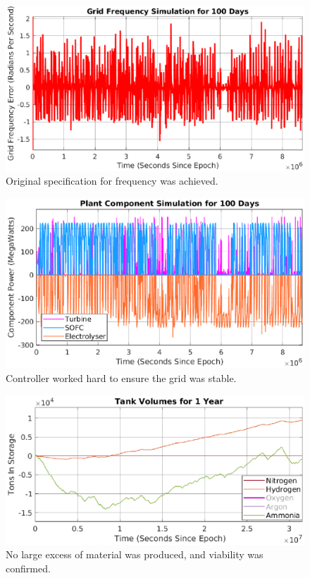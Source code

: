 \begin{figure}
\centering
        \includegraphics[scale=0.85]{images/results/omega100day.eps}
    \caption{Original specification for frequency was achieved.}
        \label{fig:grid}
\end{figure}
\begin{figure}
\centering
        \includegraphics[scale=0.85]{images/results/comp100day.eps}
    \caption{Controller worked hard to ensure the grid was stable.}
        \label{fig:grid}
\end{figure}
\begin{figure}
\centering
        \includegraphics[scale=0.85]{images/results/tanks.eps}
    \caption{No large excess of material was produced, and viability was confirmed.}
        \label{fig:grid}
\end{figure}